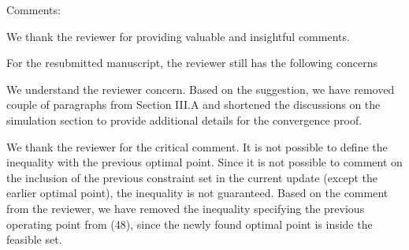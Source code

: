 Comments:

\vspace{0.1in}
We thank the reviewer for providing valuable and insightful comments.

For the resubmitted manuscript, the reviewer still has the following concerns

\begin{enumerate}
 

\resp We understand the reviewer concern. Based on the suggestion, we have removed couple of paragraphs from Section III.A and shortened the discussions on the simulation section to provide additional details for the convergence proof. 

 

\resp We thank the reviewer for the critical comment. It is not possible to define the inequality with the previous optimal point. Since it is not possible to comment on the inclusion of the previous constraint set in the current update (except the earlier optimal point), the inequality is not guaranteed. Based on the comment from the reviewer, we have removed the inequality specifying the previous operating point from (48), since the newly found optimal point is inside the feasible set. 

 


\end{enumerate}
